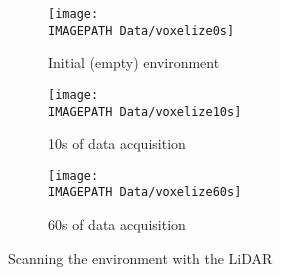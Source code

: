 \begin{figure}
	\centering
	\begin{subfigure}[b]{0.55\textwidth}
		\texttt{[image: \\IMAGEPATH Data/voxelize0s]}
		\caption{Initial (empty) environment}
		\label{fig:scaninit}
	\end{subfigure}
	
	\begin{subfigure}[b]{0.55\textwidth}
		\texttt{[image: \\IMAGEPATH Data/voxelize10s]}
		\caption{10s of data acquisition}
		\label{fig:scanten}
	\end{subfigure}
	
	\begin{subfigure}[b]{0.55\textwidth}
		\texttt{[image: \\IMAGEPATH Data/voxelize60s]}
		\caption{60s of data acquisition}
		\label{fig:scanminute}
	\end{subfigure}
	\caption{Scanning the environment with the LiDAR}
	\label{fig:scan}
\end{figure}